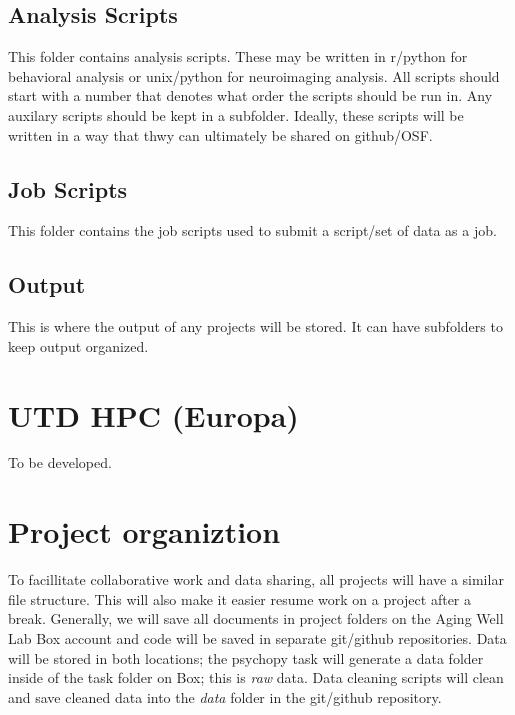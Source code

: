 \documentclass[]{book}
\begin{document}
\hypertarget{analysis-scripts}{%
\subsection{Analysis Scripts}\label{analysis-scripts}}

This folder contains analysis scripts. These may be written in r/python for behavioral analysis or unix/python for neuroimaging analysis. All scripts should start with a number that denotes what order the scripts should be run in. Any auxilary scripts should be kept in a subfolder. Ideally, these scripts will be written in a way that thwy can ultimately be shared on github/OSF.

\hypertarget{job-scripts}{%
\subsection{Job Scripts}\label{job-scripts}}

This folder contains the job scripts used to submit a script/set of data as a job.

\hypertarget{output}{%
\subsection{Output}\label{output}}

This is where the output of any projects will be stored. It can have subfolders to keep output organized.

\hypertarget{utd-hpc-europa}{%
\section{UTD HPC (Europa)}\label{utd-hpc-europa}}

To be developed.

\hypertarget{project-organiztion}{%
\section{Project organiztion}\label{project-organiztion}}

To facillitate collaborative work and data sharing, all projects will have a similar file structure. This will also make it easier resume work on a project after a break. Generally, we will save all documents in project folders on the Aging Well Lab Box account and code will be saved in separate git/github repositories. Data will be stored in both locations; the psychopy task will generate a data folder inside of the task folder on Box; this is \emph{raw} data. Data cleaning scripts will clean and save cleaned data into the \emph{data} folder in the git/github repository.
\end{document}
